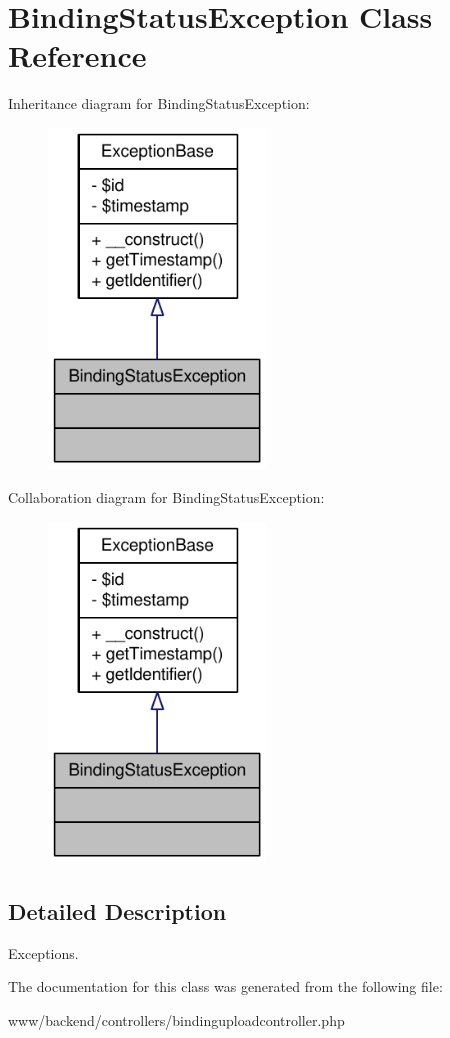 \hypertarget{classBindingStatusException}{
\section{BindingStatusException Class Reference}
\label{classBindingStatusException}
}


Inheritance diagram for BindingStatusException:\nopagebreak
\begin{figure}[H]
\begin{center}
\leavevmode
\includegraphics[width=164pt]{classBindingStatusException__inherit__graph}
\end{center}
\end{figure}


Collaboration diagram for BindingStatusException:\nopagebreak
\begin{figure}[H]
\begin{center}
\leavevmode
\includegraphics[width=164pt]{classBindingStatusException__coll__graph}
\end{center}
\end{figure}


\subsection{Detailed Description}
Exceptions. 

The documentation for this class was generated from the following file:\begin{DoxyCompactItemize}
\item 
www/backend/controllers/bindinguploadcontroller.php\end{DoxyCompactItemize}
